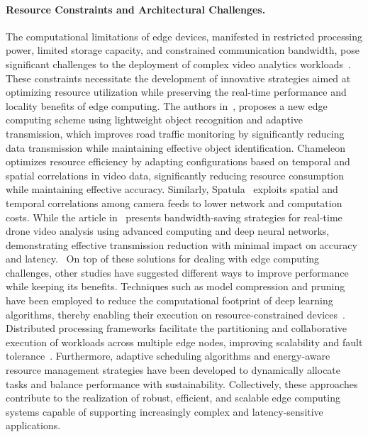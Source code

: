 \paragraph{Resource Constraints and Architectural Challenges.}
The computational limitations of edge devices, manifested in restricted processing power, limited storage capacity, and constrained communication bandwidth, pose significant challenges to the deployment of complex video analytics workloads~\cite{badidi2023opportunities,kumar2021resource,jiang2018chameleon,wang2018bandwidth}. These constraints necessitate the development of innovative strategies aimed at optimizing resource utilization while preserving the real-time performance and locality benefits of edge computing. The authors in~\cite{kumar2021resource}, proposes a new edge computing scheme using lightweight object recognition and adaptive transmission, which improves road traffic monitoring by significantly reducing data transmission while maintaining effective object identification. Chameleon~\cite{jiang2018chameleon} optimizes resource efficiency by adapting configurations based on temporal and spatial correlations in video data, significantly reducing resource consumption while maintaining effective accuracy. Similarly, Spatula~\cite{jain2020spatula} exploits spatial and temporal correlations among camera feeds to lower network and computation costs. While the article in~\cite{wang2018bandwidth} presents bandwidth-saving strategies for real-time drone video analysis using advanced computing and deep neural networks, demonstrating effective transmission reduction with minimal impact on accuracy and latency.~\newline
On top of these solutions for dealing with edge computing challenges, other studies have suggested different ways to improve performance while keeping its benefits. Techniques such as model compression and pruning have been employed to reduce the computational footprint of deep learning algorithms, thereby enabling their execution on resource-constrained devices~\cite{eccles2024dnnshifter}. Distributed processing frameworks facilitate the partitioning and collaborative execution of workloads across multiple edge nodes, improving scalability and fault tolerance~\cite{rachuri2021decentralized,zeng2020distream,201465videostorm}. Furthermore, adaptive scheduling algorithms and energy-aware resource management strategies have been developed to dynamically allocate tasks and balance performance with sustainability. Collectively, these approaches contribute to the realization of robust, efficient, and scalable edge computing systems capable of supporting increasingly complex and latency-sensitive applications.


